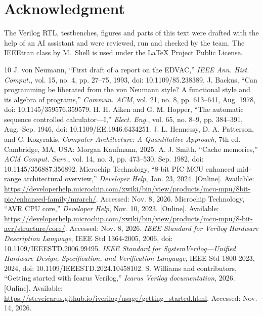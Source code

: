 \documentclass[conference,a4paper]{IEEEtran}
\begin{document}
\section*{Acknowledgment}
The Verilog RTL, testbenches, figures and parts of this text were drafted
with the help of an AI assistant and were reviewed, run and checked by
the team. The IEEEtran class by M.~Shell is used under the LaTeX Project
Public License.

\begin{thebibliography}{10}
 J. von Neumann, ``First draft of a report on the
EDVAC,'' \textit{IEEE Ann. Hist. Comput.}, vol. 15, no. 4, pp. 27--75,
1993, doi: 10.1109/85.238389.
 J. Backus, ``Can programming be liberated from the von
Neumann style? A functional style and its algebra of programs,''
\textit{Commun. ACM}, vol. 21, no. 8, pp. 613--641, Aug. 1978,
doi: 10.1145/359576.359579.
 H. H. Aiken and G. M. Hopper, ``The automatic sequence
controlled calculator---I,'' \textit{Elect. Eng.}, vol. 65, no. 8--9,
pp. 384--391, Aug.--Sep. 1946, doi: 10.1109/EE.1946.6434251.
 J. L. Hennessy, D. A. Patterson, and C. Kozyrakis,
\textit{Computer Architecture: A Quantitative Approach}, 7th ed.
Cambridge, MA, USA: Morgan Kaufmann, 2025.
 A. J. Smith, ``Cache memories,'' \textit{ACM Comput.
Surv.}, vol. 14, no. 3, pp. 473--530, Sep. 1982,
doi: 10.1145/356887.356892.
 Microchip Technology, ``8-bit PIC MCU enhanced mid-range
architectural overview,'' \textit{Developer Help}, Jan. 23, 2024.
[Online]. Available:
\url{https://developerhelp.microchip.com/xwiki/bin/view/products/mcu-mpu/8bit-pic/enhanced-family/mrarch/}.
Accessed: Nov. 8, 2026.
 Microchip Technology, ``AVR CPU core,'' \textit{Developer
Help}, Nov. 10, 2023. [Online]. Available:
\url{https://developerhelp.microchip.com/xwiki/bin/view/products/mcu-mpu/8-bit-avr/structure/core/}.
Accessed: Nov. 8, 2026.
 \textit{IEEE Standard for Verilog Hardware Description
Language}, IEEE Std 1364-2005, 2006, doi: 10.1109/IEEESTD.2006.99495.
 \textit{IEEE Standard for SystemVerilog---Unified
Hardware Design, Specification, and Verification Language}, IEEE Std
1800-2023, 2024, doi: 10.1109/IEEESTD.2024.10458102.
 S. Williams and contributors, ``Getting started with
Icarus Verilog,'' \textit{Icarus Verilog documentation}, 2026. [Online].
Available:
\url{https://steveicarus.github.io/iverilog/usage/getting_started.html}.
Accessed: Nov. 14, 2026.
\end{thebibliography}
\end{document}
